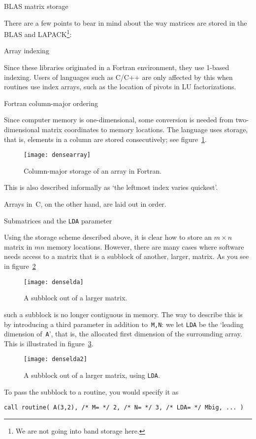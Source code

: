 {BLAS matrix storage}
\label{tut:blas-storage}

There are a few points to bear in mind about the way matrices are
stored in the BLAS and LAPACK\footnote{We are not going into band
  storage here.}:

 {Array indexing}

Since these libraries originated in a Fortran environment, they
  use 1-based indexing. Users of languages such as C/C++ are only
  affected by this when routines use index arrays, such as the
  location of pivots in LU factorizations.

 {Fortran column-major ordering}

Since computer memory is one-dimensional, some conversion is needed
from two-dimensional matrix coordinates to memory locations. The
 language uses  storage, that is,
elements in a column are stored consecutively; see
figure~\ref{fig:densearray}.
\begin{figure}
  \texttt{[image: densearray]}
  \caption{Column-major storage of an array in Fortran.}
  \label{fig:densearray}
\end{figure}
This is also described informally as `the leftmost index varies
quickest'.

Arrays in~C, on the other hand, are laid out in  order.

 {Submatrices and the {\tt LDA} parameter}

Using the storage scheme described above, it is clear how to store an
$m\times n$ matrix in $mn$ memory locations. However, there are many
cases where software needs access to a matrix that is a subblock of
another, larger, matrix. As you see in figure~\ref{fig:lda1}
\begin{figure}[ht]
  \texttt{[image: denselda]}
  \caption{A subblock out of a larger matrix.}
  \label{fig:lda1}
\end{figure}
such a subblock is no longer contiguous in memory. The way to describe
this is by introducing a third parameter in addition to~{\tt M,N}: we
let {\tt LDA} be the `leading dimension of~{\tt A}', that is, the
allocated first dimension of the surrounding array. This is
illustrated in figure~\ref{fig:lda2}.
\begin{figure}
  \texttt{[image: denselda2]}
  \caption{A subblock out of a larger matrix, using {\tt LDA}.}
  \label{fig:lda2}
\end{figure}
To pass the subblock to a routine, you would specify it as
\begin{verbatim}
call routine( A(3,2), /* M= */ 2, /* N= */ 3, /* LDA= */ Mbig, ... )
\end{verbatim}

